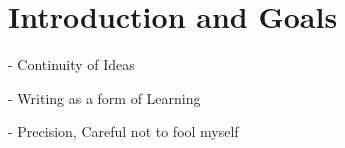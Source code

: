 \chapter{Introduction and Goals} 


- Continuity of Ideas 
\cite{Tufte2006}

- Writing as a form of Learning

- Precision, Careful not to fool myself
